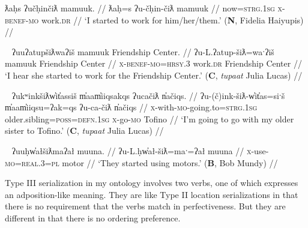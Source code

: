 \ex \label{ex:starttoworkfor}
\begingl
\glpreamble ƛaḥs ʔučḥinčiƛ mamuuk. //
\gla ƛaḥ=s ʔu-čḥin-čiƛ mamuuk //
\glb now=\textsc{strg.1sg} \textsc{x}-\textsc{benef}-\textsc{mo} work.\textsc{dr} //
\glft `I started to work for him/her/them.' (\textbf{N}, Fidelia Haiyupis) //
\endgl
\xe

\ex~ \label{ex:starttoworkfor2}
\begingl
\glpreamble ʔuuʔatupšiƛwaʔiš mamuuk Friendship Center. //
\gla ʔu-L.ʔatup-šiƛ=waˑʔiš mamuuk Friendship Center //
\glb \textsc{x}-\textsc{benef}-\textsc{mo}=\textsc{hrsy.3} work.\textsc{dr} Friendship Center //
\glft `I hear she started to work for the Friendship Center.' (\textbf{C}, \textit{tupaat} Julia Lucas) //
\endgl
\xe

\ex~ \label{ex:starttobewith}
\begingl
\glpreamble ʔukʷinkšiƛw̓it̓assiš m̓aam̓iiqsakqs ʔucačiƛ n̓ačiqs. //
\gla ʔu-(č)ink-šiƛ-w̓it̓as=siˑš m̓aam̓iiqsu=ʔak=qs ʔu-ca-čiƛ n̓ačiqs //
\glb \textsc{x}-with-\textsc{mo}-going.to=\textsc{strg.1sg} older.sibling=\textsc{poss}=\textsc{defn.1sg} \textsc{x}-go-\textsc{mo} Tofino //
\glft `I'm going to go with my older sister to Tofino.' (\textbf{C}, \textit{tupaat} Julia Lucas) //
\endgl
\xe

\ex~ \label{ex:starttouse}
\begingl
\glpreamble ʔuuḥw̓ałšiƛmaʔał muuna. //
\gla ʔu-L.ḥw̓ał-šiƛ=maˑ=ʔał muuna //
\glb \textsc{x}-use-\textsc{mo}=\textsc{real.3}=\textsc{pl} motor //
\glft `They started using motors.' (\textbf{B}, Bob Mundy) //
\endgl
\xe

Type III serialization in my ontology involves two verbs, one of which expresses an adposition-like meaning. They are like Type II location serializations in that there is no requirement that the verbs match in perfectiveness. But they are different in that there is no ordering preference.

\vspace{10pt}

\begin{comment}
\subsubsection{IV. Transitive-Intransitive Repetition}

\vspace{10pt}

Nuuchahnulth has a series of words with similar or identical meanings that differ only or mostly in transitivity. These include transitive and intransitive eat (\textit{-!iis} and \textit{haʔuk}, as in \ref{ex:eateat}) and cry and cry for (\textit{ʕiḥak} and \textit{ʔuʔuuy̓uk}, as in \ref{ex:crycry}). Speakers frequently will use both versions in a sentence.

While \textit{waa} `say' can be used as a transitive quotative, it can be used intransitively as well, similar to English \textit{speak}. It can enter into this kind of SVC in this capacity, doubling with another verb of speaking (\ref{ex:sayabout}). This characteristic doubling can also occur with \textit{ʔiiqḥuk} `tell' (\ref{ex:talkabout}).

\end{comment}

